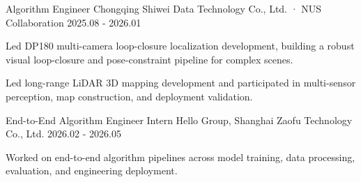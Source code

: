 \begin{cventries}

  \cventry
    {Algorithm Engineer}
    {Chongqing Shiwei Data Technology Co., Ltd. · NUS Collaboration}
    {}
    {2025.08 - 2026.01}
    {
      \begin{cvitems}
        \item {Led DP180 multi-camera loop-closure localization development, building a robust visual loop-closure and pose-constraint pipeline for complex scenes.}
        \item {Led long-range LiDAR 3D mapping development and participated in multi-sensor perception, map construction, and deployment validation.}
      \end{cvitems}
    }

  \cventry
    {End-to-End Algorithm Engineer Intern}
    {Hello Group, Shanghai Zaofu Technology Co., Ltd.}
    {}
    {2026.02 - 2026.05}
    {
      \begin{cvitems}
        \item {Worked on end-to-end algorithm pipelines across model training, data processing, evaluation, and engineering deployment.}
      \end{cvitems}
    }

\end{cventries}
